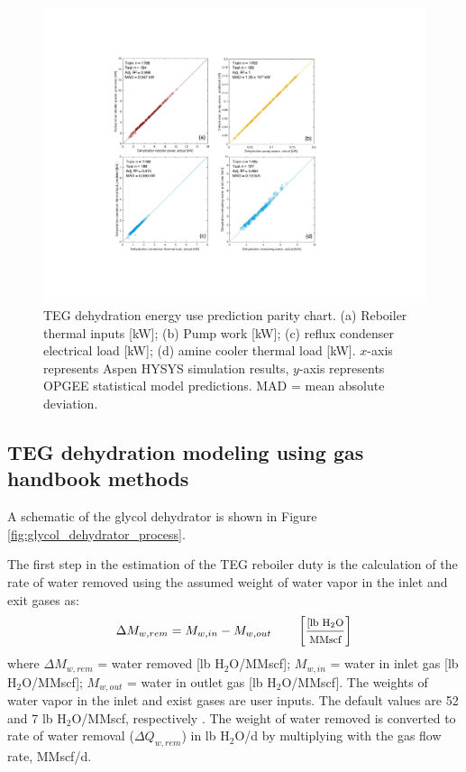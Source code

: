 \documentclass[11pt]{report}
\newcommand{\marg}[1]{{\footnotesize\textit{\textcolor{stanford}{'#1'}}}}
\newcommand{\marginnote}[1]{\marginpar{\marg{#1}}}
\begin{document}
\begin{figure}
\includegraphics[width=1\columnwidth]{images/DehydrationParity.pdf}
\caption{TEG dehydration energy use prediction parity chart. (a) Reboiler thermal inputs [kW]; (b) Pump work [kW]; (c) reflux condenser electrical load [kW]; (d) amine cooler thermal load [kW]. $x$-axis represents Aspen HYSYS simulation results, $y$-axis represents OPGEE statistical model predictions. MAD = mean absolute deviation.}
\label{fig:DehydrationParity}
\end{figure}



\subsection{TEG dehydration modeling using gas handbook methods}

A schematic of the glycol dehydrator is shown in Figure\,\ref{fig:glycol_dehydrator_process}.

The first step in the estimation of the TEG reboiler duty is the calculation of the rate of water removed using the assumed weight of water vapor in the inlet and exit gases as: \marginnote{Surface \\ Processing 2.2.2.1.3}
\begin{equation} \label{eq:water_removed}
\Delta M_{w,rem}= M_{w,in} - M_{w,out} \quad\quad \begin{footnotesize}\left[ \frac{\text{[lb H$_{2}$O}}{\text{MMscf}} \right] \end{footnotesize} 
\end{equation}
where $\Delta M_{w,rem}$ = water removed [lb H$_{2}$O/MMscf]; $M_{w,in}$ = water in inlet gas [lb H$_{2}$O/MMscf]; $M_{w,out}$ = water in outlet gas [lb H$_{2}$O/MMscf]. The weights of water vapor in the inlet and exist gases are user inputs. The default values are 52 and 7 lb H$_{2}$O/MMscf, respectively \cite[p. 160]{Manning1991}. The weight of water removed is converted to rate of water removal ($\Delta Q_{w,rem}$) in lb H$_{2}$O/d by multiplying with the gas flow rate, MMscf/d.
\end{document}
